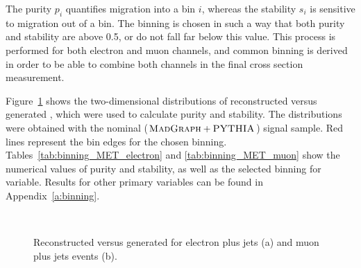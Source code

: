 The purity $p_i$ quantifies migration into a bin $i$, whereas the stability $s_i$ is sensitive to migration out of a
bin. The binning is chosen in such a way that both purity and stability are above \num{0.5}, or do not fall far below
this value. This process is performed for both electron and muon channels, and common binning is derived in order to be
able to combine both channels in the final cross section measurement.

Figure~\ref{fig:choice_of_bins_MET} shows the two-dimensional distributions of reconstructed versus generated \MET,
which were used to calculate purity and stability. The distributions were obtained with the nominal
($\textsc{MadGraph}+{\textsc{PYTHIA}}$) signal \ttbar sample. Red lines represent the bin edges for the chosen binning.
Tables~\ref{tab:binning_MET_electron} and \ref{tab:binning_MET_muon} show the numerical values of purity and stability,
as well as the selected binning for \MET variable. Results for other primary variables can be found in
Appendix~\ref{a:binning}.



\begin{figure}[!htbp]
	\centering
	\hfill
	\\
	\caption[Reconstructed versus generated \MET]{Reconstructed versus generated \MET for electron plus jets (a) and
	muon plus jets events (b).}
	\label{fig:choice_of_bins_MET}
 \end{figure}

